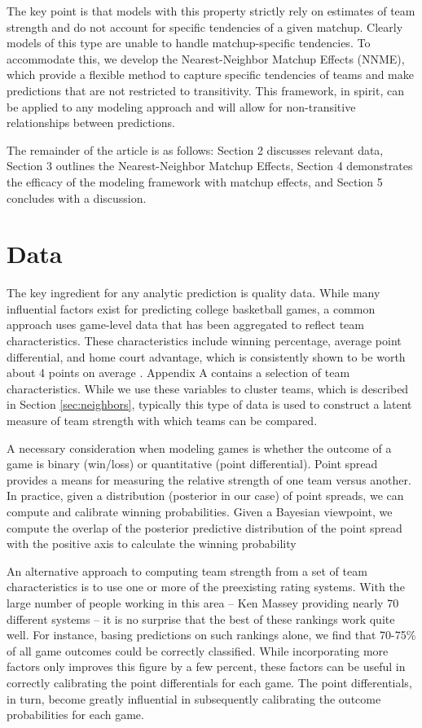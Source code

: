 \documentclass[letterpaper,12pt]{article}
\begin{document}
The key point is that models with this property strictly rely on estimates of team strength and do not account for specific tendencies of a given matchup. Clearly models of this type are unable to handle matchup-specific tendencies. To accommodate this, we develop the Nearest-Neighbor Matchup Effects (NNME), which provide a flexible method to capture specific tendencies of teams and make predictions that are not restricted to transitivity. This framework, in spirit, can be applied to any modeling approach and will allow for non-transitive relationships between predictions.

The remainder of the article is as follows: Section 2 discusses relevant data, Section 3 outlines the Nearest-Neighbor Matchup Effects, Section 4 demonstrates the efficacy of the modeling framework with matchup effects, and Section 5 concludes with a discussion.
\section{Data}
The key ingredient for any analytic prediction is quality data. While many influential factors exist for predicting college basketball games, a common approach uses game-level data that has been aggregated to reflect team characteristics. These characteristics include winning percentage, average point differential, and home court advantage, which is consistently shown to be worth about 4 points on average \citep{harville1994}. Appendix A contains a selection of team characteristics. While we use these variables to cluster teams, which is described in Section \ref{sec:neighbors}, typically this type of data is used to construct a latent measure of team strength with which teams can be compared. 

A necessary consideration when modeling games is whether the outcome of a game is binary (win/loss) or quantitative (point differential). Point spread provides a means for measuring the relative strength of one team versus another. In practice, given a distribution (posterior in our case) of point spreads, we can compute and calibrate winning probabilities. Given a Bayesian viewpoint, we compute the overlap of the posterior predictive distribution of the point spread with the positive axis to calculate the winning probability

An alternative approach to computing team strength from a set of team characteristics is to use one or more of the preexisting rating systems. With the large number of people working in this area -- Ken Massey \citep{kenmassey.com} providing nearly 70 different systems -- it is no surprise that the best of these rankings work quite well. For instance, basing predictions on such rankings alone, we find that 70-75\% of all game outcomes could be correctly classified. While incorporating more factors only improves this figure by a few percent, these factors can be useful in correctly calibrating the point differentials for each game. The point differentials, in turn, become greatly influential in subsequently calibrating the outcome probabilities for each game.
\end{document}
